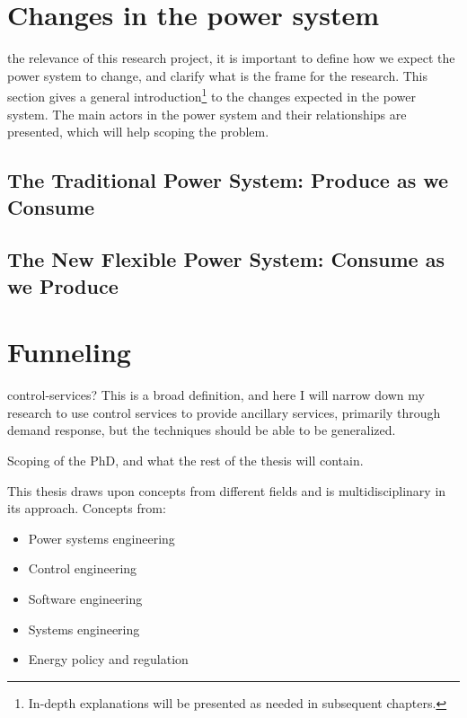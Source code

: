 \section{Changes in the power system}%
\label{sec:powsysdesc}
  the relevance of this research project, it is important to define how we expect the power system to change, and clarify what is the frame for the research. This section gives a general introduction\footnote{In-depth explanations will be presented as needed in subsequent chapters.} to the changes expected in the power system. The main actors in the power system and their relationships are presented, which will help scoping the problem.
\subsection*{The Traditional Power System: Produce as we Consume}
\label{sub:traditional}

\subsection*{The New Flexible Power System: Consume as we Produce}
\label{sub:future}


\section{Funneling} %
\label{sec:Funneling}
 control-services? This is a broad definition, and here I will  narrow down my research to use control services to provide ancillary services, primarily through demand response, but the techniques should be able to be generalized.

Scoping of the PhD, and what the rest of the thesis will contain.

This thesis draws upon concepts from different fields and is multidisciplinary in its approach. Concepts from:
\begin{itemize}
	\item Power systems engineering
	\item Control engineering
	\item Software engineering
	\item Systems engineering
	\item Energy policy and regulation
\end{itemize}

